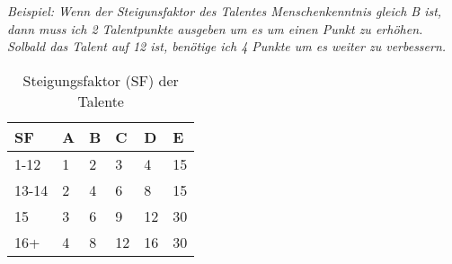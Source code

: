 \textit{Beispiel: Wenn der Steigunsfaktor des Talentes Menschenkenntnis gleich B ist, dann muss ich 2 Talentpunkte ausgeben um es um einen Punkt zu erhöhen. Solbald das Talent auf 12 ist, benötige ich 4 Punkte um es weiter zu verbessern.}

\begin{table}[h]
\begin{center}
\begin{tabular}{|l|l|l|l|l|l|}
\hline
\textbf{SF} & \textbf{A} & \textbf{B} & \textbf{C} & \textbf{D} & \textbf{E} \\

\hline
1-12 & 1 & 2 & 3 & 4 & 15 \\

\hline
13-14 & 2 & 4 & 6 & 8 & 15 \\

\hline
15 & 3 & 6 & 9 & 12 & 30 \\

\hline
16+ & 4 & 8 & 12 & 16 & 30 \\

\hline
\end{tabular}
\end{center}
\caption{Steigungsfaktor (SF) der Talente}
\label{tab:Steigungsfaktor}
\end{table}

